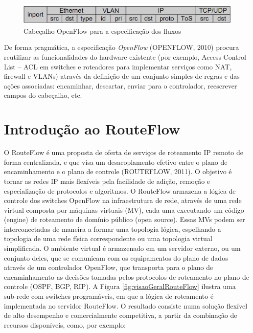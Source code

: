 \begin{figure}[hb] \centering
\includegraphics[width=160mm]{cabecalhoOpenflow.png}
\caption{Cabeçalho OpenFlow para a especificação dos fluxos}
\label{fig:cabecalhoOpenflow}
\end{figure}

De forma pragmática, a especificação \textit{OpenFlow}
(OPENFLOW, 2010) procura reutilizar as funcionalidades do
hardware existente (por exemplo, Access Control List – ACL
em switches e roteadores para implementar serviços como NAT,
firewall e VLANs) através da definição de um conjunto
simples de regras e das ações associadas: encaminhar,
descartar, enviar para o controlador, reescrever campos do
cabeçalho, etc.

\section{Introdução ao RouteFlow}

O RouteFlow é uma proposta de oferta de serviços de
roteamento IP remoto de forma centralizada, e que visa um
desacoplamento efetivo entre o plano de encaminhamento e o
plano de controle (ROUTEFLOW, 2011). O objetivo é tornar as
redes IP mais flexíveis pela facilidade de adição,
remoção e especialização de protocolos e algoritmos.
O RouteFlow armazena a lógica de
controle dos switches OpenFlow na infraestrutura de rede,
através de uma rede virtual composta por máquinas virtuais
(MV), cada uma executando um código
(engine) de roteamento de domínio público (open source).
Essas MVs podem ser interconectadas
de maneira a formar uma topologia lógica, espelhando a
topologia de uma rede física correspondente ou uma topologia
virtual simplificada. O ambiente virtual é armazenado em um
servidor externo, ou um conjunto deles, que se comunicam com
os equipamentos do plano de dados através de um controlador
OpenFlow, que transporta para o plano de encaminhamento as
decisões tomadas pelos protocolos de roteamento no plano de
controle (OSPF, BGP, RIP). A Figura
\ref{fig:visaoGeralRouteFlow} ilustra uma sub-rede com
switches programáveis, em que a lógica de roteamento é
implementada no servidor RouteFlow. O resultado consiste
numa solução flexível de alto desempenho e comercialmente
competitiva, a partir da combinação de recursos disponíveis,
como, por exemplo:

